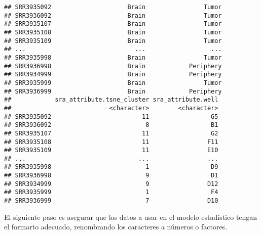 \documentclass[
]{article}
\begin{document}
\begin{verbatim}
## SRR3935092                     Brain                Tumor
## SRR3936092                     Brain                Tumor
## SRR3935107                     Brain                Tumor
## SRR3935108                     Brain                Tumor
## SRR3935109                     Brain                Tumor
## ...                              ...                  ...
## SRR3935998                     Brain                Tumor
## SRR3936998                     Brain            Periphery
## SRR3934999                     Brain            Periphery
## SRR3935999                     Brain                Tumor
## SRR3936999                     Brain            Periphery
##            sra_attribute.tsne_cluster sra_attribute.well
##                           <character>        <character>
## SRR3935092                         11                 G5
## SRR3936092                          8                 B1
## SRR3935107                         11                 G2
## SRR3935108                         11                F11
## SRR3935109                         11                E10
## ...                               ...                ...
## SRR3935998                          1                 D9
## SRR3936998                          9                 D1
## SRR3934999                          9                D12
## SRR3935999                          1                 F4
## SRR3936999                          7                D10
\end{verbatim}

El siguiente paso es asegurar que los datos a usar en el modelo
estadístico tengan el formarto adecuado, renombrando los caracteres a
números o factores.
\end{document}
